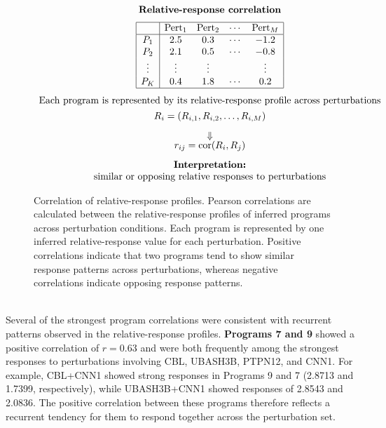 \documentclass[11pt,a4paper]{article}
\begin{document}
\begin{figure}[h]
	\centering
	\setlength{\abovecaptionskip}{2pt}
	\[
	\begin{array}{c}
	\textbf{Relative-response correlation}\\[6pt]
	\underset{\text{}}{
		\begin{array}{|c|cccc|}
		\hline
		& \mathrm{Pert}_1 & \mathrm{Pert}_2 & \cdots & \mathrm{Pert}_M\\
		\hline
		P_1 & 2.5 & 0.3 & \cdots & -1.2\\
		P_2 & 2.1 & 0.5 & \cdots & -0.8\\
		\vdots & \vdots & \vdots & & \vdots\\
		P_K & 0.4 & 1.8 & \cdots & 0.2\\
		\hline
		\end{array}}
	\\[8pt]
	\text{Each program is represented by its relative-response profile across perturbations}\\[4pt]
	R_i=(R_{i,1},R_{i,2},\ldots,R_{i,M})\\[8pt]
	\Downarrow\\[-2pt]
	r_{ij}=\operatorname{cor}(R_i,R_j)\\[8pt]
	\textbf{Interpretation:}\\
	\text{similar or opposing relative responses to perturbations}
	\end{array}
	\]
	\caption{Correlation of relative-response profiles. Pearson correlations are calculated between the relative-response profiles of inferred programs across perturbation conditions. Each program is represented by one inferred relative-response value for each perturbation. Positive correlations indicate that two programs tend to show similar response patterns across perturbations, whereas negative correlations indicate opposing response patterns.}
	\label{fig:relative_response_correlation}
\end{figure} \\

Several of the strongest program correlations were consistent with recurrent patterns observed in the relative-response profiles. \textbf{Programs 7 and 9} showed a positive correlation of $r=0.63$ and were both frequently among the strongest responses to perturbations involving CBL, UBASH3B, PTPN12, and CNN1. For example, CBL+CNN1 showed strong responses in Programs 9 and 7 (2.8713 and 1.7399, respectively), while UBASH3B+CNN1 showed responses of 2.8543 and 2.0836. The positive correlation between these programs therefore reflects a recurrent tendency for them to respond together across the perturbation set.
\end{document}
